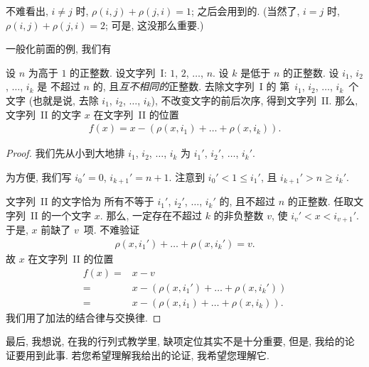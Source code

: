 不难看出, \(i \neq j\) 时,
\(\rho(i, j) + \rho(j, i) = 1\);
之后会用到的.
(当然了, \(i = j\) 时, \(\rho(i, j) + \rho(j, i) = 2\);
可是, 这没那么重要.)

\vspace{2ex}

一般化前面的例, 我们有

\begin{theorem}[缺项定位]
    设 \(n\) 为高于 \(1\) 的正整数.
    设文字列~I: \(1\), \(2\), \(\dots\), \(n\).
    设 \(k\) 是低于 \(n\) 的正整数.
    设 \(i_1\), \(i_2\), \(\dots\), \(i_k\) 是%
    不超过 \(n\) 的, 且\emph{互不相同的}正整数.
    去除文字列~I 的%
    第~\(i_1\), \(i_2\), \(\dots\), \(i_k\)~个文字
    (也就是说, 去除 \(i_1\), \(i_2\), \(\dots\), \(i_k\)),
    不改变文字的前后次序,
    得到文字列~II.
    那么,
    文字列~II 的文字 \(x\)
    在文字列~II 的位置
    \begin{align*}
        f(x) = x - (\rho(x, i_1) + \dots + \rho(x, i_k)).
    \end{align*}
\end{theorem}

\begin{proof}
    我们先从小到大地排
    \(i_1\), \(i_2\), \(\dots\), \(i_k\)
    为
    \(i_1'\), \(i_2'\), \(\dots\), \(i_k'\).

    为方便, 我们写
    \(i_0' = 0\),
    \(i_{k+1}' = n + 1\).
    注意到 \(i_0' < 1 \leq i_1'\),
    且 \(i_{k+1}' > n \geq i_k'\).

    文字列~II 的文字恰为%
    所有不等于
    \(i_1'\), \(i_2'\), \(\dots\), \(i_k'\)
    的, 且不超过 \(n\) 的正整数.
    任取文字列~II 的一个文字 \(x\).
    那么, 一定存在不超过 \(k\) 的非负整数 \(v\),
    使 \(i_v' < x < i_{v+1}'\).
    于是,
    \(x\) 前缺了 \(v\)~项.
    不难验证
    \begin{align*}
        \rho(x, i_1') + \dots + \rho(x, i_k') = v.
    \end{align*}
    故 \(x\) 在文字列~II 的位置
    \begin{align*}
        f(x)
        = {} &
        x - v
        \\
        = {} &
        x - (\rho(x, i_1') + \dots + \rho(x, i_k'))
        \\
        = {} &
        x - (\rho(x, i_1) + \dots + \rho(x, i_k)).
    \end{align*}
    我们用了加法的结合律与交换律.
\end{proof}

最后, 我想说,
在我的行列式教学里,
缺项定位其实不是十分重要,
但是,
我给的论证要用到此事.
若您希望理解我给出的论证,
我希望您理解它.

